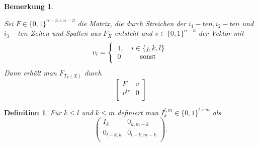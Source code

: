 \documentclass[12pt,titlepage,twoside,cleardoublepage]{article}
\theoremstyle{nummermitklammern}
\newtheorem{definition}[temp]{Definition}
\newtheorem{bemerkung}[temp]{Bemerkung}
\newtheorem{definition}[zahl]{Definition}
\newtheorem{bemerkung}[zahl]{Bemerkung}
\numberwithin{equation}{section}
\begin{document}
\begin{bemerkung}
\begin{enumerate}
\begin{itemize}
Sei $F\in \{0,1\}^{n-3\times n-3}$ die Matrix, die durch Streichen der $i_1-ten,i_2-ten$ und $i_3-ten$ Zeilen und Spalten  aus $F_X$ entsteht und $v\in \{0,1\}^{n-3}$ der Vektor mit
\[
v_{i}=
\Biggl{\{\begin{tabular}[l]{lcr}
1,&\textcolor{black}{$i\in \{j,k,l\}$} \\
0& sonst\\
\end{tabular}}
\] Dann erhält man $F_{T_V(X)}$ durch 
\[
\left[ 
\begin{array}{c|ccc} 
  F & v \\ 
  \hline 
  {v}^{tr} & 0\\
\end{array} 
\right]
\]
\end{itemize}
\end{enumerate}

\end{bemerkung}
\begin{definition}
Für $k\leq l$ und $k\leq m$ definiert man $I^{l,m}_k\in \{0,1\}^{l \times m}$ als
\[
\left( 
\begin{array}{cccc} 
  I_k & 0_{k,m-k} \\
  0_{l-k,k} & 0_{l-k,m-k}\\
\end{array} 
\right).
\]
\end{definition}
\end{document}
